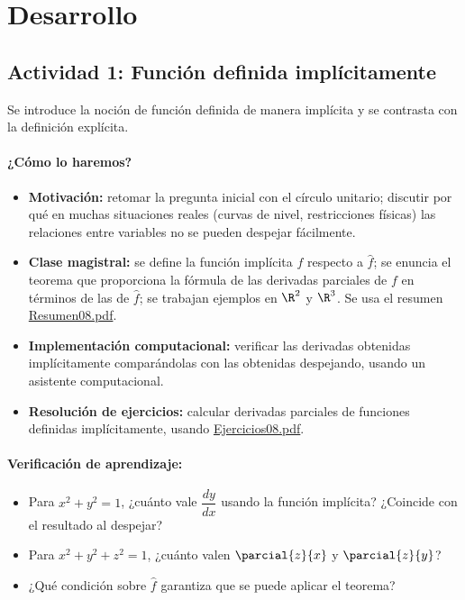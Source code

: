 \documentclass[a4,11pt]{aleph-notas}
\begin{document}
\section*{Desarrollo}

\subsection*{Actividad 1: Función definida implícitamente}
Se introduce la noción de función definida de manera implícita y se contrasta con la definición explícita.

\paragraph{¿Cómo lo haremos?}
\begin{itemize}[leftmargin=*]
    \item \textbf{Motivación:} retomar la pregunta inicial con el círculo unitario; discutir por qué en muchas situaciones reales (curvas de nivel, restricciones físicas) las relaciones entre variables no se pueden despejar fácilmente.
    \item \textbf{Clase magistral:} se define la función implícita $f$ respecto a $\hat{f}$; se enuncia el teorema que proporciona la fórmula de las derivadas parciales de $f$ en términos de las de $\hat{f}$; se trabajan ejemplos en $\R^2$ y $\R^3$. Se usa el resumen \href{https://andres-merino.github.io/MatematicaIII-05-N0051/01Resumen/Resumen08.pdf}{Resumen08.pdf}.
    \item \textbf{Implementación computacional:} verificar las derivadas obtenidas implícitamente comparándolas con las obtenidas despejando, usando un asistente computacional.
    \item \textbf{Resolución de ejercicios:} calcular derivadas parciales de funciones definidas implícitamente, usando \href{https://andres-merino.github.io/MatematicaIII-05-N0051/04Ejercicios/Ejercicios08.pdf}{Ejercicios08.pdf}.
\end{itemize}

\paragraph{Verificación de aprendizaje:}
\begin{itemize}[leftmargin=*]
    \item Para $x^2+y^2=1$, ¿cuánto vale $\dfrac{dy}{dx}$ usando la función implícita? ¿Coincide con el resultado al despejar?
    \item Para $x^2+y^2+z^2=1$, ¿cuánto valen $\parcial{z}{x}$ y $\parcial{z}{y}$?
    \item ¿Qué condición sobre $\hat{f}$ garantiza que se puede aplicar el teorema?
\end{itemize}
\end{document}
